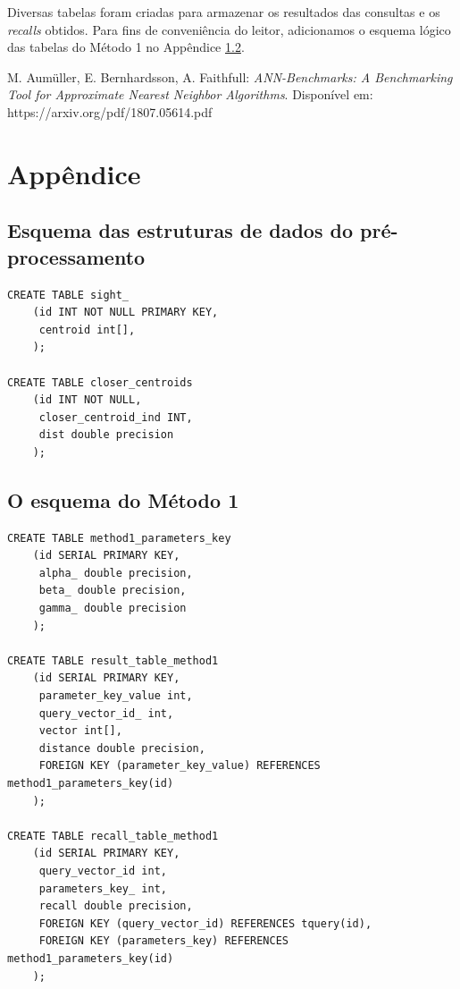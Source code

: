 \documentclass[a4paper,12pt,titlepage]{scrartcl}
\begin{document}
Diversas tabelas foram criadas para armazenar os resultados das consultas e os \emph{recalls} obtidos. Para fins de conveniência do leitor, adicionamos o esquema lógico das tabelas do Método 1 no Appêndice \ref{app1}. 

\begin{thebibliography}{99}

 M. Aum\"{u}ller, E. Bernhardsson, A. Faithfull: \emph{ANN-Benchmarks: A Benchmarking Tool for Approximate Nearest Neighbor Algorithms}. Disponível em: https://arxiv.org/pdf/1807.05614.pdf


\end{thebibliography}

\appendix


\section{Appêndice}

\subsection{Esquema das estruturas de dados do pré-processamento}\label{app0}

\begin{lstlisting}[caption = O esquema do pré-processamento, label = esqmet0]
CREATE TABLE sight_
	(id INT NOT NULL PRIMARY KEY,
	 centroid int[],
	);

CREATE TABLE closer_centroids 
	(id INT NOT NULL, 
	 closer_centroid_ind INT, 
	 dist double precision
	);
\end{lstlisting}
\vspace{5mm}

\subsection{O esquema do Método 1}\label{app1}


\begin{lstlisting}[caption = O esquema do Método 1, label = esqmet1]
CREATE TABLE method1_parameters_key 
	(id SERIAL PRIMARY KEY, 
	 alpha_ double precision,
	 beta_ double precision,
	 gamma_ double precision
	);

CREATE TABLE result_table_method1
	(id SERIAL PRIMARY KEY,
	 parameter_key_value int,
	 query_vector_id_ int,
	 vector int[],
	 distance double precision,
	 FOREIGN KEY (parameter_key_value) REFERENCES method1_parameters_key(id)
	);

CREATE TABLE recall_table_method1
	(id SERIAL PRIMARY KEY,
	 query_vector_id int,
	 parameters_key_ int,
	 recall double precision,
	 FOREIGN KEY (query_vector_id) REFERENCES tquery(id),
	 FOREIGN KEY (parameters_key) REFERENCES method1_parameters_key(id)
	);

\end{lstlisting}
\vspace{5mm}
\end{document}
